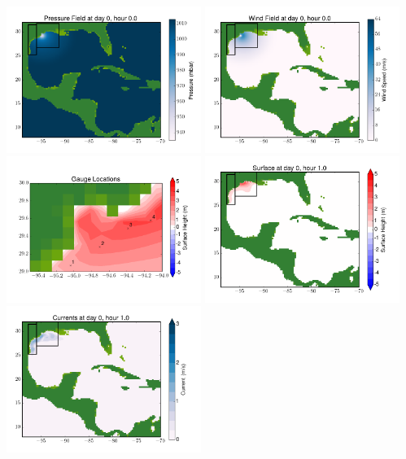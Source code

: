 \documentclass[11pt]{article}
\begin{document}
\includegraphics[width=0.475\textwidth]{frame0072fig8.png}
\vskip 10pt 
\includegraphics[width=0.475\textwidth]{frame0072fig9.png}
\includegraphics[width=0.475\textwidth]{frame0072fig10.png}
\vskip 10pt 
\includegraphics[width=0.475\textwidth]{frame0073fig1.png}
\includegraphics[width=0.475\textwidth]{frame0073fig2.png}
\end{document}
